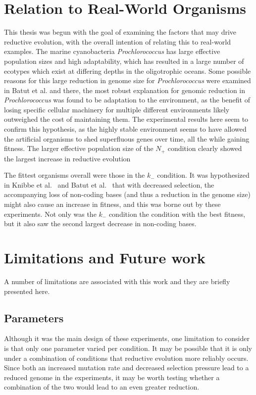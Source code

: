 \section{Relation to Real-World Organisms}

This thesis was begun with the goal of examining the factors that may drive reductive evolution, with the overall intention of relating this to real-world examples. The marine cyanobacteria \textit{Prochlorococcus} has large effective population sizes and high adaptability, which has resulted in a large number of ecotypes which exist at differing depths in the oligotrophic oceans. Some possible reasons for this large reduction in genome size for \textit{Prochlorococcus} were examined in Batut et al.\cite{Batut.2014} and there, the most robust explanation for genomic reduction in \textit{Prochlorococcus} was found to be adaptation to the environment, as the benefit of losing specific cellular machinery for multiple different environments likely outweighed the cost of maintaining them. The experimental results here seem to confirm this hypothesis, as the highly stable environment seems to have allowed the artificial organisms to shed superfluous genes over time, all the while gaining fitness. The larger effective population size of the $N_+$ condition clearly showed the largest increase in reductive evolution

The fittest organisms overall were those in the $k_-$ condition. It was hypothesized in Knibbe et al.~\cite{Knibbe2007} and Batut et al.~\cite{Batut.2013} that with decreased selection, the accompanying loss of non-coding bases (and thus a reduction in the genome size) might also cause an increase in fitness, and this was borne out by these experiments. Not only was the $k_-$ condition the condition with the best fitness, but it also saw the second largest decrease in non-coding bases. 
  
\section{Limitations and Future work}\label{limitations}
A number of limitations are associated with this work and they are briefly presented here. 
\subsection{Parameters}
Although it was the main design of these experiments, one limitation to consider is that only one parameter varied per condition. It may be possible that it is only under a combination of conditions that reductive evolution more reliably occurs. Since both an increased mutation rate and decreased selection pressure lead to a reduced genome in the experiments, it may be worth testing whether a combination of the two would lead to an even greater reduction. 

